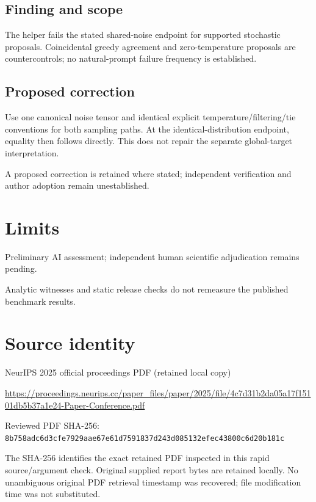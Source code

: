 \documentclass[11pt]{article}
\begin{document}
\subsection*{Finding and scope}

The helper fails the stated shared-noise endpoint for supported stochastic proposals. Coincidental greedy agreement and zero-temperature proposals are countercontrols; no natural-prompt failure frequency is established.

\subsection*{Proposed correction}

Use one canonical noise tensor and identical explicit temperature/filtering/tie conventions for both sampling paths. At the identical-distribution endpoint, equality then follows directly. This does not repair the separate global-target interpretation.

A proposed correction is retained where stated; independent verification and author adoption remain unestablished.

\section*{Limits}

Preliminary AI assessment; independent human scientific adjudication remains pending.\par

Analytic witnesses and static release checks do not remeasure the published benchmark results.\par

\section*{Source identity}

NeurIPS 2025 official proceedings PDF (retained local copy)

\url{https://proceedings.neurips.cc/paper_files/paper/2025/file/4c7d31b2da05a17f15101db5b37a1e24-Paper-Conference.pdf}

Reviewed PDF SHA-256: \nolinkurl{8b758adc6d3cfe7929aae67e61d7591837d243d085132efec43800c6d20b181c}

The SHA-256 identifies the exact retained PDF inspected in this rapid source/argument check. Original supplied report bytes are retained locally. No unambiguous original PDF retrieval timestamp was recovered; file modification time was not substituted.
\end{document}
